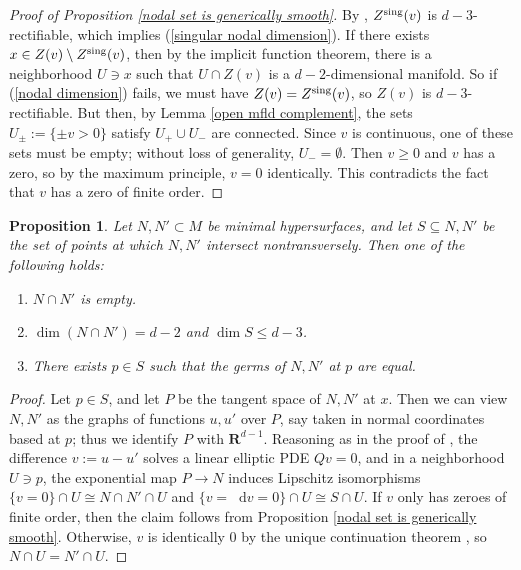 \documentclass[reqno,11pt]{amsart}
\newcommand{\RR}{\mathbf{R}}
\newcommand*\dif{\mathop{}\!\mathrm{d}}
\newtheorem{proposition}[theorem]{Proposition}
\theoremstyle{definition}
\numberwithin{equation}{section}
\begin{document}
\begin{proof}[Proof of Proposition \ref{nodal set is generically smooth}]
By \cite[Lemma 1.9]{Hardt89}, $Z^{\rm sing}(v)$ is $d - 3$-rectifiable, which implies (\ref{singular nodal dimension}).
If there exists $x \in Z(v) \setminus Z^{\rm sing}(v)$, then by the implicit function theorem, there is a neighborhood $U \ni x$ such that $U \cap Z(v)$ is a $d - 2$-dimensional manifold.
So if (\ref{nodal dimension}) fails, we must have $Z(v) = Z^{\rm sing}(v)$, so $Z(v)$ is $d - 3$-rectifiable.
But then, by Lemma \ref{open mfld complement}, the sets $U_\pm := \{\pm v > 0\}$ satisfy $U_+ \cup U_-$ are connected.
Since $v$ is continuous, one of these sets must be empty; without loss of generality, $U_- = \emptyset$.
Then $v \geq 0$ and $v$ has a zero, so by the maximum principle, $v = 0$ identically.
This contradicts the fact that $v$ has a zero of finite order.
\end{proof}

\begin{proposition}\label{intersection theory prop}
Let $N, N' \subset M$ be minimal hypersurfaces, and let $S \subseteq N, N'$ be the set of points at which $N, N'$ intersect nontransversely.
Then one of the following holds:
\begin{enumerate}
\item $N \cap N'$ is empty.
\item $\dim(N \cap N') = d - 2$ and $\dim S \leq d - 3$.
\item There exists $p \in S$ such that the germs of $N, N'$ at $p$ are equal.
\end{enumerate}
\end{proposition}
\begin{proof}
Let $p \in S$, and let $P$ be the tangent space of $N, N'$ at $x$.
Then we can view $N, N'$ as the graphs of functions $u, u'$ over $P$, say taken in normal coordinates based at $p$; thus we identify $P$ with $\RR^{d - 1}$.
Reasoning as in the proof of \cite[Theorem 7.3]{colding2011course}, the difference $v := u - u'$ solves a linear elliptic PDE $Qv = 0$, and in a neighborhood $U \ni p$, the exponential map $P \to N$ induces Lipschitz isomorphisms $\{v = 0\} \cap U \cong N \cap N' \cap U$ and $\{v = \dif v = 0\} \cap U \cong S \cap U$.
If $v$ only has zeroes of finite order, then the claim follows from Proposition \ref{nodal set is generically smooth}.
Otherwise, $v$ is identically $0$ by the unique continuation theorem \cite[Theorem 6.1]{colding2011course}, so $N \cap U = N' \cap U$.
\end{proof}
\end{document}
